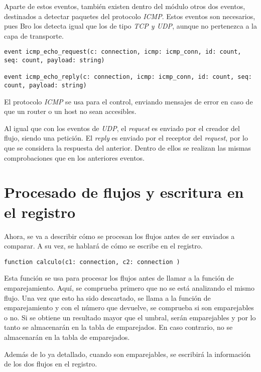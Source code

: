 \intro Aparte de estos eventos, también existen dentro del módulo otros dos eventos, destinados a detectar 
paquetes del protocolo \textit{ICMP}. Estos eventos son necesarios, pues Bro los detecta igual que los 
de tipo \textit{TCP y UDP}, aunque no pertenezca a la capa de transporte.

\begin{lstlisting}[style=CodigoC]
event icmp_echo_request(c: connection, icmp: icmp_conn, id: count, seq: count, payload: string)

event icmp_echo_reply(c: connection, icmp: icmp_conn, id: count, seq: count, payload: string)
\end{lstlisting}

\intro El protocolo \textit{ICMP} se usa para el control, enviando mensajes de error en caso de que un router o un host 
no sean accesibles.

\intro Al igual que con los eventos de \textit{UDP}, el \textit{request} es enviado por el creador del flujo, 
siendo una petición. El \textit{reply} es enviado por el receptor del \textit{request}, por lo que se considera 
la respuesta del anterior. Dentro de ellos se realizan las mismas comprobaciones que en los anteriores eventos.

\section{Procesado de flujos y escritura en el registro}

Ahora, se va a describir cómo se procesan los flujos antes de ser enviados a comparar. A su vez, se hablará de cómo se escribe en el 
registro.

\begin{lstlisting}[style=CodigoC]
function calculo(c1: connection, c2: connection )
\end{lstlisting}

\intro Esta función se usa para procesar los flujos antes de llamar a la función de emparejamiento. Aquí, se comprueba primero que no se está analizando el mismo flujo. Una vez que esto ha sido descartado, se llama a la función de emparejamiento y con el número que devuelve, se comprueba si son emparejables o no. Si se obtiene un resultado mayor que el umbral, serán emparejables y por lo tanto se almacenarán en la tabla de emparejados. En caso contrario, no se almacenarán en la tabla de emparejados.

\intro Además de lo ya detallado, cuando son emparejables, se escribirá la información de los dos flujos en el registro.

